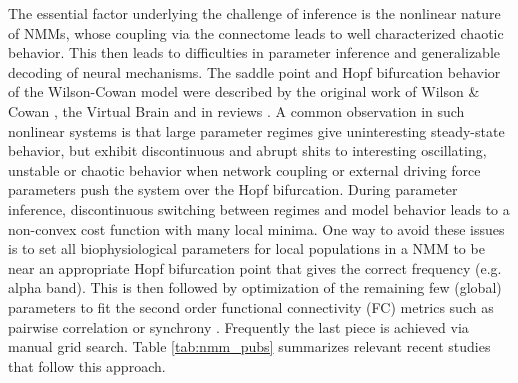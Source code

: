 The essential factor underlying the challenge of inference is the nonlinear nature of NMMs, whose coupling via the connectome leads to well characterized chaotic behavior. This then leads to difficulties in parameter inference and generalizable decoding of neural mechanisms. The saddle point and Hopf bifurcation behavior of the Wilson-Cowan model were described by the original work of Wilson \& Cowan \cite{Wilson1972}, the Virtual Brain \cite{sanz-leon_mathematical_2015} and in reviews \cite{breakspear_dynamic_2017}. A common observation in such nonlinear systems is that large parameter regimes give uninteresting steady-state behavior, but exhibit discontinuous and abrupt shits to interesting oscillating, unstable or chaotic behavior when network coupling or external driving force parameters push the system over the Hopf bifurcation. During parameter inference, discontinuous switching between regimes and model behavior leads to a non-convex cost function with many local minima. One way to avoid these issues is to set all biophysiological parameters for local populations in a NMM to be near an appropriate Hopf bifurcation point that gives the correct frequency (e.g. alpha band). This is then followed by optimization of the remaining few (global) parameters to fit the second order functional connectivity (FC) metrics such as pairwise correlation or synchrony \cite{Zimmermann2018, Deco2009, abeysuriya_biophysical_2018, wang_inversion_2019, demirtas_hierarchical_2019, honey_predicting_2009}. Frequently the last piece is achieved via manual grid search. Table \ref{tab:nmm_pubs} summarizes relevant recent studies that follow this approach.

